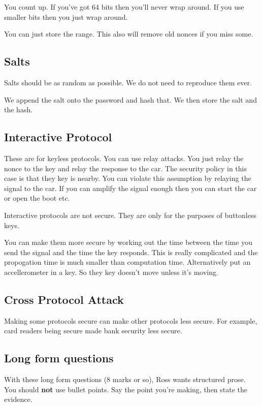 \documentclass[10pt, a4paper]{article}
\begin{document}
You count up. If you've got 64 bits then you'll never wrap around. If you use smaller bits then you
just wrap around.

You can just store the range. This also will remove old nonces if you miss some.

\subsection{Salts}

Salts should be as random as possible. We do not need to reproduce them ever.

We append the salt onto the password and hash that. We then store the salt and the hash.

\subsection{Interactive Protocol}

These are for keyless protocols. You can use relay attacks. You just relay the nonce to
the key and relay the response to the car. The security policy in this case is that they key
is nearby. You can violate this assumption by relaying the signal to the car. If you can amplify the
signal enough then you can start the car or open the boot etc.

Interactive protocols are not secure. They are only for the purposes of buttonless keys.

You can make them more secure by working out the time between the time you send the signal and
the time the key responds. This is really complicated and the propogation time is much smaller than
computation time. Alternatively put an accellerometer in a key. So they key doesn't move unless it's
moving.

\subsection{Cross Protocol Attack}

Making some protocols secure can make other protocols less secure.
For example, card readers being secure made bank security less secure.

\subsection{Long form questions}

With these long form questions (8 marks or so), Ross wants structured prose. You should \textbf{not} use
bullet points.
Say the point you're making, then state the evidence.
\end{document}
